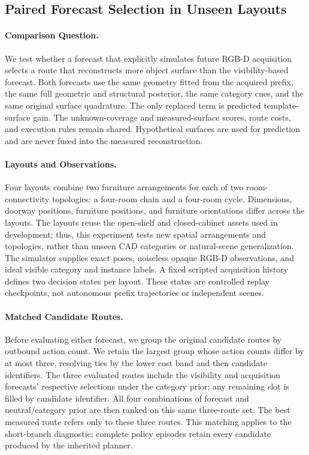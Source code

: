 \subsection{Paired Forecast Selection in Unseen Layouts}
\label{sec:paired-forecast-layouts}

\paragraph{Comparison Question.}
We test whether a forecast that explicitly simulates future RGB-D acquisition selects a route that reconstructs more object surface than the visibility-based forecast. Both forecasts use the same geometry fitted from the acquired prefix, the same full geometric and structural posterior, the same category cues, and the same original surface quadrature. The only replaced term is predicted template-surface gain. The unknown-coverage and measured-surface scores, route costs, and execution rules remain shared. Hypothetical surfaces are used for prediction and are never fused into the measured reconstruction.

\paragraph{Layouts and Observations.}
Four layouts combine two furniture arrangements for each of two room-connectivity topologies: a four-room chain and a four-room cycle. Dimensions, doorway positions, furniture positions, and furniture orientations differ across the layouts. The layouts reuse the open-shelf and closed-cabinet assets used in development; thus, this experiment tests new spatial arrangements and topologies, rather than unseen CAD categories or natural-scene generalization. The simulator supplies exact poses, noiseless opaque RGB-D observations, and ideal visible category and instance labels. A fixed scripted acquisition history defines two decision states per layout. These states are controlled replay checkpoints, not autonomous prefix trajectories or independent scenes.

\paragraph{Matched Candidate Routes.}
Before evaluating either forecast, we group the original candidate routes by outbound action count. We retain the largest group whose action counts differ by at most three, resolving ties by the lower cost band and then candidate identifiers. The three evaluated routes include the visibility and acquisition forecasts' respective selections under the category prior; any remaining slot is filled by candidate identifier. All four combinations of forecast and neutral/category prior are then ranked on this same three-route set. The best measured route refers only to these three routes. This matching applies to the short-branch diagnostic; complete policy episodes retain every candidate produced by the inherited planner.

